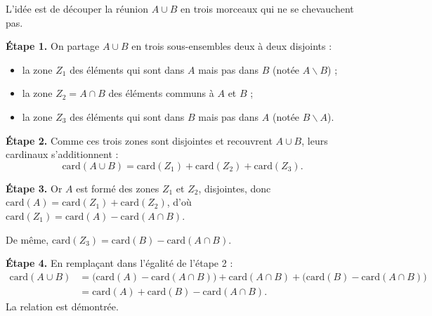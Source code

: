 \documentclass[11pt]{article}
\def\setminus{\mathbin{\backslash}}\let\smallsetminus\setminus
\begin{document}
\begin{experience}
L'idée est de découper la réunion $A \cup B$ en trois morceaux qui ne se chevauchent pas.

\textbf{Étape 1.} On partage $A \cup B$ en trois sous-ensembles deux à deux disjoints :
\begin{itemize}
\item la zone $Z_1$ des éléments qui sont dans $A$ mais pas dans $B$ (notée $A \setminus B$) ;
\item la zone $Z_2 = A \cap B$ des éléments communs à $A$ et $B$ ;
\item la zone $Z_3$ des éléments qui sont dans $B$ mais pas dans $A$ (notée $B \setminus A$).
\end{itemize}

\textbf{Étape 2.} Comme ces trois zones sont disjointes et recouvrent $A \cup B$, leurs cardinaux s'additionnent :
\[ \mathrm{card}(A \cup B) = \mathrm{card}(Z_1) + \mathrm{card}(Z_2) + \mathrm{card}(Z_3). \]

\textbf{Étape 3.} Or $A$ est formé des zones $Z_1$ et $Z_2$, disjointes, donc $\mathrm{card}(A) = \mathrm{card}(Z_1) + \mathrm{card}(Z_2)$, d'où $\mathrm{card}(Z_1) = \mathrm{card}(A) - \mathrm{card}(A \cap B)$.

De même, $\mathrm{card}(Z_3) = \mathrm{card}(B) - \mathrm{card}(A \cap B)$.

\textbf{Étape 4.} En remplaçant dans l'égalité de l'étape 2 :
\begin{align*}
\mathrm{card}(A \cup B) &= \big(\mathrm{card}(A) - \mathrm{card}(A \cap B)\big) + \mathrm{card}(A \cap B) + \big(\mathrm{card}(B) - \mathrm{card}(A \cap B)\big) \\
&= \mathrm{card}(A) + \mathrm{card}(B) - \mathrm{card}(A \cap B).
\end{align*}
La relation est démontrée.
\end{experience}
\end{document}

